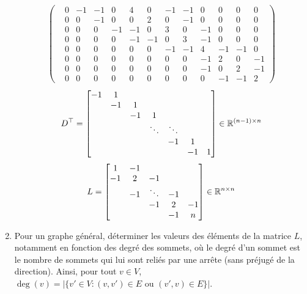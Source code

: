 \documentclass[a4paper,11pt,twoside]{exam}
\begin{document}
\begin{exercice}
\begin{enumerate}[resume,label=\Roman{numeroexo} - \arabic*.]
\begin{solution}
\begin{align*}
\begin{pmatrix}
        & 0 & -1 & -1 &  0 &  4 &  0 & -1 & -1 &  0 &  0 &  0 &  0 \\
        & 0 &  0 & -1 &  0 &  0 &  2 &  0 & -1 &  0 &  0 &  0 &  0 \\
        & 0 &  0 &  0 & -1 & -1 &  0 &  3 &  0 & -1 &  0 &  0 &  0 \\
        & 0 &  0 &  0 &  0 & -1 & -1 &  0 &  3 & -1 &  0 &  0 &  0 \\
        & 0 &  0 &  0 &  0 &  0 &  0 & -1 & -1 &  4 & -1 & -1 &  0 \\
        & 0 &  0 &  0 &  0 &  0 &  0 &  0 &  0 & -1 &  2 &  0 & -1 \\
        & 0 &  0 &  0 &  0 &  0 &  0 &  0 &  0 & -1 &  0 &  2 & -1 \\
        & 0 &  0 &  0 &  0 &  0 &  0 &  0 &  0 &  0 & -1 & -1 &  2
        \end{pmatrix}
    \end{align*}
    \begin{align*}
    D^\top=
    \begin{bmatrix}
    -1 & 1  &    &                       &                       &    &   \\
       & -1 & 1  &                       &                       &    &   \\
       &    & -1 & 1                     &                       &    &   \\
       &    &    & \ddots                & \ddots                &    &   \\
       &    &    &                       & -1                    & 1  &   \\
       &    &    &                       &                       & -1 & 1
   \end{bmatrix}\in\mathbb{R}^{(n-1) \times n}
    \end{align*}
    \begin{align*}
    L=
    \begin{bmatrix}
        1  & -1 &        &       & \\
        -1 & 2  & -1     &       & \\
           & -1 & \ddots & -1    & \\
           &    & -1     & 2 & -1  \\
           &    &        & -1    & n
    \end{bmatrix}\in\mathbb{R}^{n \times n}
    \end{align*}
    \end{solution}

    \item Pour un graphe général, déterminer les valeurs des éléments de la matrice $L$, notamment en fonction des degré des sommets, où le degré d'un sommet est le nombre de sommets qui lui sont reliés par une arrête (sans préjugé de la direction). Ainsi, pour tout $v\in V$, $\deg(v) = |\{v' \in V: (v,v') \in E \text{ ou } (v',v) \in E \}|$.
 \end{enumerate}
\end{exercice}
\end{document}
